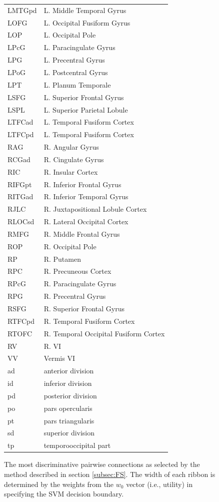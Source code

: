 \documentclass{llncs}
\begin{document}
\begin{figure}[htb]
\begin{minipage}[b]{.4\linewidth}
\begin{tabular}{l l}
LMTGpd	& L. Middle Temporal Gyrus\\
LOFG	& L. Occipital Fusiform Gyrus\\
LOP	& L. Occipital Pole\\
LPcG	& L. Paracingulate Gyrus\\
LPG	& L. Precentral Gyrus\\
LPoG	& L. Postcentral Gyrus\\
LPT	& L. Planum Temporale\\
LSFG	& L. Superior Frontal Gyrus\\
LSPL	& L. Superior Parietal Lobule\\
LTFCad	& L. Temporal Fusiform Cortex\\
LTFCpd	& L. Temporal Fusiform Cortex\\
RAG	& R. Angular Gyrus\\
RCGad	& R. Cingulate Gyrus\\
RIC	& R. Insular Cortex\\
RIFGpt	& R. Inferior Frontal Gyrus\\
RITGad	& R. Inferior Temporal Gyrus\\
RJLC	& R. Juxtapositional Lobule Cortex\\
RLOCsd	& R. Lateral Occipital Cortex\\
RMFG	& R. Middle Frontal Gyrus\\
ROP	& R. Occipital Pole\\
RP	& R. Putamen\\
RPC	& R. Precuneous Cortex\\
RPcG	& R. Paracingulate Gyrus\\
RPG	& R. Precentral Gyrus\\
RSFG	& R. Superior Frontal Gyrus\\
RTFCpd	& R. Temporal Fusiform Cortex\\
RTOFC	& R. Temporal Occipital Fusiform Cortex\\
RV	& R. VI\\
VV	& Vermis VI\\
\hline
ad & anterior division\\
id & inferior division\\
pd & posterior division\\
po & pars opercularis\\
pt & pars triangularis\\
sd & superior division\\
tp & temporooccipital part\\
\hline
\end{tabular}
\par\vspace{0pt}
\end{minipage}
\caption{The most discriminative pairwise connections as selected by the method described in section \ref{subsec:FS}.  The width of each ribbon is determined by the weights from the $w_0$ vector (i.e., utility) in  specifying the SVM decision boundary. }
\label{fig:circos}
\end{figure}
\end{document}
